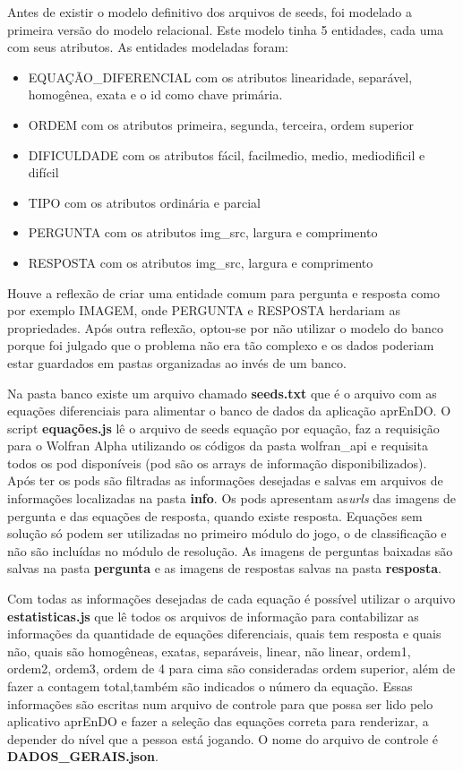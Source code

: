 Antes de existir o modelo definitivo dos arquivos de seeds, foi modelado a primeira versão do modelo relacional.
Este modelo tinha 5 entidades, cada uma com seus atributos. As entidades modeladas foram: 
\begin{itemize}
	\item EQUAÇÃO\_DIFERENCIAL com os atributos linearidade, separável, homogênea, exata e o id como chave primária.
	\item ORDEM com os atributos primeira, segunda, terceira, ordem superior
	\item DIFICULDADE com os atributos fácil, facilmedio, medio, mediodificil e difícil
	\item TIPO com os atributos ordinária e parcial
	\item PERGUNTA com os atributos img\_src, largura e comprimento
	\item RESPOSTA com os atributos img\_src, largura e comprimento
\end{itemize}

Houve a reflexão de criar uma entidade comum para pergunta e resposta como por exemplo IMAGEM, onde PERGUNTA e RESPOSTA herdariam as propriedades. Após outra reflexão, optou-se por não utilizar o modelo do banco porque foi julgado que o problema não era tão complexo e os dados poderiam estar guardados em pastas organizadas ao invés de um banco.

Na pasta banco existe um arquivo chamado \textbf{seeds.txt} que é o arquivo com as equações diferenciais para alimentar o banco de dados da aplicação aprEnDO. O script \textbf{equações.js} lê o arquivo de seeds equação por equação, faz a requisição para o Wolfran Alpha utilizando os códigos da pasta wolfran\_api e requisita todos os pod disponíveis (pod são os arrays de informação disponibilizados). Após ter os pods são filtradas as informações desejadas e salvas em arquivos de informações localizadas na pasta \textbf{info}. Os pods apresentam as\textit{urls} das imagens de pergunta e das equações de resposta, quando existe resposta. Equações sem solução só podem ser utilizadas no primeiro módulo do jogo, o de classificação e não são incluídas no módulo de resolução. As imagens de perguntas baixadas são salvas na pasta \textbf{pergunta} e as imagens de respostas salvas na pasta \textbf{resposta}.

Com todas as informações desejadas de cada equação é possível utilizar o arquivo \textbf{estatisticas.js} que lê todos os arquivos de informação para contabilizar as informações da quantidade de equações diferenciais, quais tem resposta e quais não, quais são homogêneas, exatas, separáveis, linear, não linear, ordem1, ordem2, ordem3, ordem de 4 para cima são consideradas ordem superior, além de fazer a contagem total,também são indicados o número da equação. Essas informações são escritas num arquivo de controle para que possa ser lido pelo aplicativo aprEnDO e fazer a seleção das equações correta para renderizar, a depender do nível que a pessoa está jogando. O nome do arquivo de controle é \textbf{DADOS\_GERAIS.json}.


